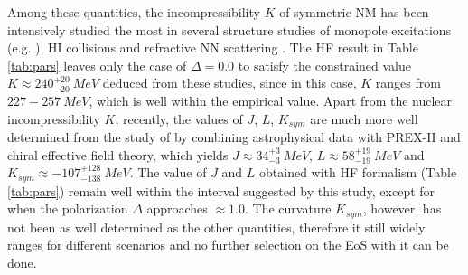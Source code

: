 Among these quantities, the incompressibility $K$ of symmetric \gls{NM} has been intensively studied the most in several structure studies of monopole excitations (e.g. \cite{garg2018compression}), \gls{HI} collisions and refractive \gls{NN} scattering \citep{khoa2007nuclear}. The \gls{HF} result in Table \ref{tab:pars} leaves only the case of $\Delta=0.0$ to satisfy the constrained value $K\approx 240^{+20}_{-20}\:MeV$ deduced from these studies, since in this case, $K$ ranges from $227-257\:MeV$, which is well within the empirical value. Apart from the nuclear incompressibility $K$, recently, the values of $J$, $L$, $K_{sym}$ are much more well determined from the study of \cite{essick2021astrophysical} by combining astrophysical data with PREX-II and chiral effective field theory, which yields $J\approx 34^{+3}_{-3}\:MeV$, $L\approx 58^{+19}_{-19}\:MeV$ and $K_{sym}\approx -107^{+128}_{-138}\:MeV$. The value of $J$ and $L$ obtained with \gls{HF} formalism (Table \ref{tab:pars}) remain well within the interval suggested by this study, except for when the polarization $\Delta$ approaches $\approx 1.0$. The curvature $K_{sym}$, however, has not been as well determined as the other quantities, therefore it still widely ranges for different scenarios and no further selection on the \gls{EoS} with it can be done.
